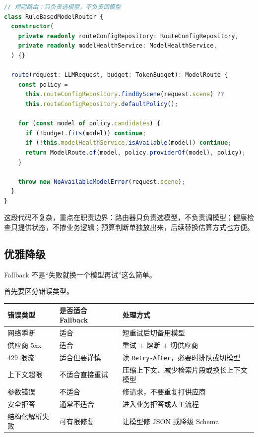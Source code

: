 \documentclass[9pt,a4paper,twocolumn]{ctexart}
\begin{document}
\begin{lstlisting}[language=TypeScript]
// 规则路由：只负责选模型，不负责调模型
class RuleBasedModelRouter {
  constructor(
    private readonly routeConfigRepository: RouteConfigRepository,
    private readonly modelHealthService: ModelHealthService,
  ) {}

  route(request: LLMRequest, budget: TokenBudget): ModelRoute {
    const policy =
      this.routeConfigRepository.findByScene(request.scene) ??
      this.routeConfigRepository.defaultPolicy();

    for (const model of policy.candidates) {
      if (!budget.fits(model)) continue;
      if (!this.modelHealthService.isAvailable(model)) continue;
      return ModelRoute.of(model, policy.providerOf(model), policy);
    }

    throw new NoAvailableModelError(request.scene);
  }
}
\end{lstlisting}



这段代码不复杂，重点在职责边界：路由器只负责选模型，不负责调模型；健康检查只提供状态，不掺业务逻辑；预算判断单独放出来，后续替换估算方式也方便。



\subsection*{优雅降级}


Fallback 不是“失败就换一个模型再试”这么简单。



首先要区分错误类型。


{\footnotesize
\begin{tabular}{|p{}|p{}|p{}|}
\hline
\textbf{错误类型} & \textbf{是否适合 Fallback} & \textbf{处理方式} \\
\hline
网络瞬断 & 适合 & 短重试后切备用模型 \\
\hline
供应商 5xx & 适合 & 重试 + 熔断 + 切供应商 \\
\hline
429 限流 & 适合但要谨慎 & 读 \texttt{Retry-After}，必要时排队或切模型 \\
\hline
上下文超限 & 不适合直接重试 & 压缩上下文、减少检索片段或换长上下文模型 \\
\hline
参数错误 & 不适合 & 修请求，不要重复打供应商 \\
\hline
安全拒答 & 通常不适合 & 进入业务拒答或人工流程 \\
\hline
结构化解析失败 & 可有限修复 & 让模型修 JSON 或降级 Schema \\
\hline
\end{tabular}
}
\end{document}
